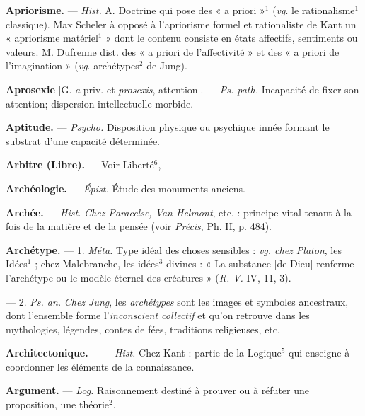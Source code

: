 \begin{itemize}[leftmargin=1cm, label=, itemsep=1pt]
{{{{\item {\bf Apriorisme.} — \textsf{\textit {Hist.}} A. Doctrine qui
pose des « a priori »$^1$ ({\it vg}. le rationalisme$^1$ classique). Max Scheler à
opposé à l’apriorisme formel et rationaliste de Kant un « apriorisme
matériel$^1$ » dont le contenu consiste
en états affectifs, sentiments ou
valeurs. M. Dufrenne dist. des « a
priori de l’affectivité » et des « a
priori de l'imagination » ({\it vg}. archétypes$^2$ de Jung).

\item {\bf Aprosexie} [G. {\it a} priv. et {\it prosexis}, attention]. — \textsf{\textit {Ps. path.}} Incapacité de
fixer son attention; dispersion intellectuelle morbide.

\item {\bf Aptitude.} — \textsf{\textit {Psycho.}} Disposition physique ou psychique innée formant le
substrat d’une capacité déterminée.

\item {\bf Arbitre (Libre).} — Voir Liberté$^6$,

\item {\bf Archéologie.} — \textsf{\textit {Épist.}} Étude des monuments anciens.

\item {\bf Archée.} — \textsf{\textit {Hist.}} {\it Chez Paracelse, Van
Helmont}, etc. : principe vital tenant
à la fois de la matière et de la pensée
(voir {\it Précis}, Ph. II, p. 484).

\item {\bf Archétype.} — 1. \textsf{\textit {Méta.}} Type idéal des
choses sensibles : {\it vg. chez Platon},
les Idées$^1$ ; chez Malebranche, les
idées$^3$ divines : « La substance [de
Dieu] renferme l’archétype ou le
modèle éternel des créatures » ({\it R. V.}
IV, 11, 3).

— 2. \textsf{\textit {Ps. an.}} {\it Chez Jung}, les {\it archétypes} sont les images et symboles
ancestraux, dont l’ensemble forme
l’{\it inconscient collectif} et qu’on retrouve dans les mythologies,
légendes, contes de fées, traditions religieuses, etc.

\item {\bf Architectonique.} —— \textsf{\textit {Hist.}} Chez Kant :
partie de la Logique$^5$ qui enseigne à
coordonner les éléments de la connaissance.

\item {\bf Argument.} — \textsf{\textit {Log.}} Raisonnement destiné à prouver ou à réfuter une
proposition, une théorie$^2$.

}}}}
\end{itemize}
